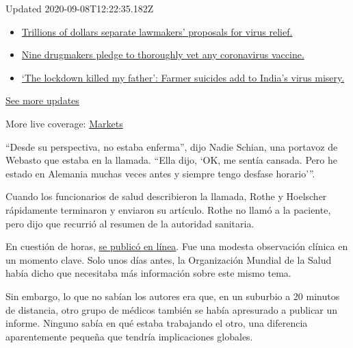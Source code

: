 Updated 2020-09-08T12:22:35.182Z

\begin{itemize}
\tightlist
\item
  \href{https://www.nytimes3xbfgragh.onion/2020/09/08/world/covid-19-coronavirus.html?action=click\&pgtype=Article\&state=default\&region=MAIN_CONTENT_1\&context=storylines_live_updates\#link-46162376}{Trillions
  of dollars separate lawmakers' proposals for virus relief.}
\item
  \href{https://www.nytimes3xbfgragh.onion/2020/09/08/world/covid-19-coronavirus.html?action=click\&pgtype=Article\&state=default\&region=MAIN_CONTENT_1\&context=storylines_live_updates\#link-679303d7}{Nine
  drugmakers pledge to thoroughly vet any coronavirus vaccine.}
\item
  \href{https://www.nytimes3xbfgragh.onion/2020/09/08/world/covid-19-coronavirus.html?action=click\&pgtype=Article\&state=default\&region=MAIN_CONTENT_1\&context=storylines_live_updates\#link-1c973131}{`The
  lockdown killed my father': Farmer suicides add to India's virus
  misery.}
\end{itemize}

\href{https://www.nytimes3xbfgragh.onion/2020/09/08/world/covid-19-coronavirus.html?action=click\&pgtype=Article\&state=default\&region=MAIN_CONTENT_1\&context=storylines_live_updates}{See
more updates}

More live coverage:
\href{https://www.nytimes3xbfgragh.onion/live/2020/09/08/business/stock-market-today-coronavirus?action=click\&pgtype=Article\&state=default\&region=MAIN_CONTENT_1\&context=storylines_live_updates}{Markets}

``Desde su perspectiva, no estaba enferma'', dijo Nadie Schian, una
portavoz de Webasto que estaba en la llamada. ``Ella dijo, `OK, me
sentía cansada. Pero he estado en Alemania muchas veces antes y siempre
tengo desfase horario'''.

Cuando los funcionarios de salud describieron la llamada, Rothe y
Hoelscher rápidamente terminaron y enviaron su artículo. Rothe no llamó
a la paciente, pero dijo que recurrió al resumen de la autoridad
sanitaria.

En cuestión de horas,
\href{https://www.nejm.org/doi/full/10.1056/NEJMc2001468}{se publicó en
línea}. Fue una modesta observación clínica en un momento clave. Solo
unos días antes, la Organización Mundial de la Salud había dicho que
necesitaba más información sobre este mismo tema.

Sin embargo, lo que no sabían los autores era que, en un suburbio a 20
minutos de distancia, otro grupo de médicos también se había apresurado
a publicar un informe. Ninguno sabía en qué estaba trabajando el otro,
una diferencia aparentemente pequeña que tendría implicaciones globales.

